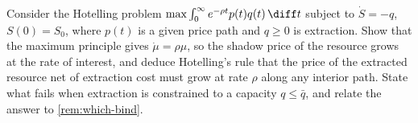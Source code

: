 \begin{exercise}\label{ex:ct-3}
	Consider the Hotelling problem $\max\int_0^{\infty}e^{-\rho t}p(t)q(t)\,\diff t$
	subject to $\dot S=-q$, $S(0)=S_0$, where $p(t)$ is a given price path and
	$q\geq0$ is extraction. Show that the maximum principle gives
	$\dot\mu=\rho\mu$, so the shadow price of the resource grows at the rate of
	interest, and deduce Hotelling's rule that the price of the extracted resource
	net of extraction cost must grow at rate $\rho$ along any interior path. State
	what fails when extraction is constrained to a capacity $q\leq\bar q$, and
	relate the answer to \autoref{rem:which-bind}.
\end{exercise}
